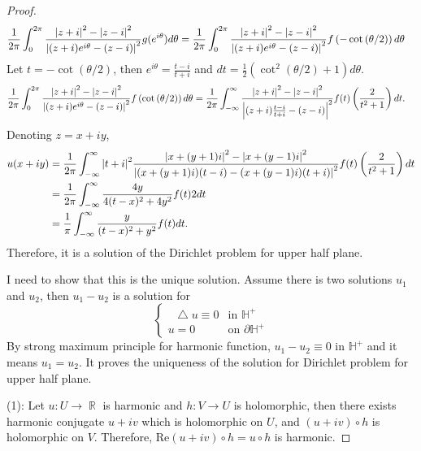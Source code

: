\documentclass{article}
\DeclareMathOperator{\rr}{\mathbb{R}}
\newcommand*\Laplace{\mathop{}\!\mathbin\bigtriangleup}
\begin{document}
\begin{enumerate}
\begin{proof}
\begin{equation*}
\begin{split}
\frac{1}{2\pi}\int_0^{2\pi}\frac{\abs{z+i}^2-\abs{z-i}^2}{\abs{(z+i)e^{i\theta}-(z-i)}^2}g(e^{i\theta})d\theta &= \frac{1}{2\pi}\int_0^{2\pi}\frac{\abs{z+i}^2-\abs{z-i}^2}{\abs{(z+i)e^{i\theta}-(z-i)}^2}f\left(-\cot\left(\theta/2\right)\right)d\theta
\end{split}
\end{equation*}
Let $t=-\cot(\theta/2)$, then $e^{i\theta}=\frac{t-i}{t+i}$ and $dt=\frac{1}{2}(\cot^2(\theta/2)+1)d\theta$.
\begin{equation*}
\begin{split}
\frac{1}{2\pi}\int_0^{2\pi}\frac{\abs{z+i}^2-\abs{z-i}^2}{\abs{(z+i)e^{i\theta}-(z-i)}^2}f\left(\cot\left(\theta/2\right)\right)d\theta &= \frac{1}{2\pi}\int_{-\infty}^{\infty}\frac{\abs{z+i}^2-\abs{z-i}^2}{\abs{(z+i)\frac{t-i}{t+i}-(z-i)}^2}f(t)\left(\frac{2}{t^2+1}\right)dt.
\end{split}
\end{equation*}
Denoting $z=x+iy$,
\begin{equation*}
\begin{split}
u(x+iy)&=\frac{1}{2\pi}\int_{-\infty}^{\infty}\abs{t+i}^2\frac{\abs{x+(y+1)i}^2-\abs{x+(y-1)i}^2}{\abs{(x+(y+1)i)(t-i)-(x+(y-1)i)(t+i)}^2}f(t)\left(\frac{2}{t^2+1}\right)dt \\
&=\frac{1}{2\pi}\int_{-\infty}^{\infty}\frac{4y}{4(t-x)^2+4y^2}f(t)2dt \\
&=\frac{1}{\pi}\int_{-\infty}^\infty \frac{y}{(t-x)^2+y^2}f(t)dt.
\end{split}
\end{equation*}
Therefore, it is a solution of the Dirichlet problem for upper half plane.

I need to show that this is the unique solution. Assume there is two solutions $u_1$ and $u_2$, then $u_1-u_2$ is a solution for 
\begin{equation*}
\begin{cases}
\Laplace u\equiv 0 & \text{in }\mathbb{H}^+ \\
u=0 & \text{on }\partial \mathbb{H}^+
\end{cases}
\end{equation*}
By strong maximum principle for harmonic function, $u_1-u_2\equiv 0$ in $\mathbb{H}^+$ and it means $u_1=u_2$. It proves the uniqueness of the solution for Dirichlet problem for upper half plane.

(1): Let $u:U\rightarrow \rr$ is harmonic and $h:V\rightarrow U$ is holomorphic, then there exists harmonic conjugate $u+iv$ which is holomorphic on $U$, and $(u+iv)\circ h$ is holomorphic on $V$. Therefore, $\text{Re}(u+iv)\circ h=u\circ h$ is harmonic.
\end{proof}
\end{enumerate}
\end{document}
